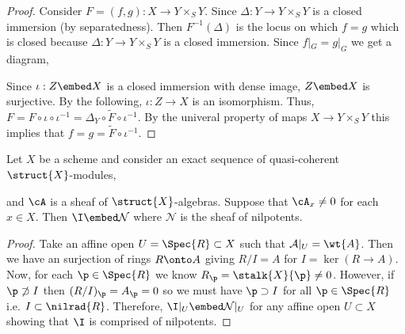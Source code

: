 \documentclass[12pt]{article}
\begin{document}
\begin{proof}
Consider $F = (f, g) : X \to Y \times_S Y$. Since $\Delta : Y \to Y \times_S Y$ is a closed immersion (by separatedness). Then $F^{-1}(\Delta)$ is the locus on which $f = g$ which is closed because $\Delta : Y \to Y \times_S Y$ is a closed immersion. Since $f|_G = g|_G$ we get a diagram,
\begin{center}
\end{center}
Since $\iota : Z \embed X$ is a closed immersion with dense image, $Z \embed X$ is surjective. By the following, $\iota : Z \to X$ is an isomorphism. Thus, $F = F \circ \iota \circ \iota^{-1} = \Delta_Y \circ \tilde{F} \circ \iota^{-1}$. By the univeral property of maps $X \to Y \times_S Y$ this implies that $f = g = \tilde{F} \circ \iota^{-1}$.
\end{proof}

\newcommand{\Nil}{\mathcal{N}}

\begin{lemma}
Let $X$ be a scheme and consider an exact sequence of quasi-coherent $\struct{X}$-modules,
\begin{center}
\end{center}
and $\cA$ is a sheaf of $\struct{X}$-algebras. 
Suppose that $\cA_x \neq 0$ for each $x \in X$. Then $\I \embed \Nil$ where $\Nil$ is the sheaf of nilpotents.
\end{lemma}

\begin{proof}
Take an affine open $U = \Spec{R} \subset X$ such that $\mathcal{A} |_{U} = \wt{A}$. Then we have an surjection of rings $R \onto A$ giving $R/I = A$ for $I = \ker{(R \to A)}$. Now, for each $\p \in \Spec{R}$ we know $R_\p = \stalk{X}{\p} \neq 0$. However, if $\p \not\supset I$ then $(R/I)_\p = A_\p = 0$ so we must have $\p \supset I$ for all $\p \in \Spec{R}$ i.e. $I \subset \nilrad{R}$. Therefore, $\I |_U \embed \Nil|_U$ for any affine open $U \subset X$ showing that $\I$ is comprised of nilpotents. 
\end{proof}
\end{document}
